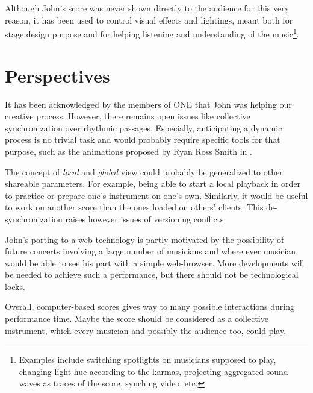 Although John's score was never shown directly to the audience for this very reason, it has been used to control visual effects and lightings, meant both for stage design purpose and for helping listening and understanding of the music\footnote{Examples include switching spotlights on musicians supposed to play, changing light hue according to the karmas, projecting aggregated sound waves as traces of the score, synching video, etc.}.

\section{Perspectives}

It has been acknowledged by the members of ONE that John was helping our creative process. However, there remains open issues like collective synchronization over rhythmic passages. Especially, anticipating a dynamic process is no trivial task and would probably require specific tools for that purpose, such as the animations proposed by Ryan Ross Smith in \cite{smith_atomic_2015}.

The concept of \textit{local} and \textit{global} view could probably be generalized to other shareable parameters. For example, being able to start a local playback in order to practice or prepare one's instrument on one's own. Similarly, it would be useful to work on another score than the ones loaded on others' clients. This de-synchronization raises however issues of versioning conflicts.

John's porting to a web technology is partly motivated by the possibility of future concerts involving a large number of musicians and where ever musician would be able to see his part with a simple web-browser. More developments will be needed to achieve such a performance, but there should not be technological locks.

Overall, computer-based scores gives way to many possible interactions during performance time. Maybe the score should be considered as a collective instrument,  which every musician and possibly the audience too, could play.

